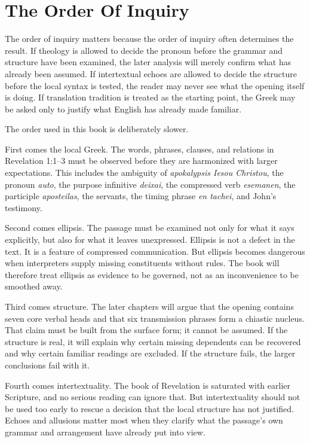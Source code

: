 \section{The Order Of Inquiry}

The order of inquiry matters because the order of inquiry often determines the result. If theology is allowed to decide the pronoun before the grammar and structure have been examined, the later analysis will merely confirm what has already been assumed. If intertextual echoes are allowed to decide the structure before the local syntax is tested, the reader may never see what the opening itself is doing. If translation tradition is treated as the starting point, the Greek may be asked only to justify what English has already made familiar.

The order used in this book is deliberately slower.

First comes the local Greek. The words, phrases, clauses, and relations in Revelation 1:1--3 must be observed before they are harmonized with larger expectations. This includes the ambiguity of \textit{apokalypsis Iesou Christou}, the pronoun \textit{auto}, the purpose infinitive \textit{deixai}, the compressed verb \textit{esemanen}, the participle \textit{aposteilas}, the servants, the timing phrase \textit{en tachei}, and John's testimony.

Second comes ellipsis. The passage must be examined not only for what it says explicitly, but also for what it leaves unexpressed. Ellipsis is not a defect in the text. It is a feature of compressed communication. But ellipsis becomes dangerous when interpreters supply missing constituents without rules. The book will therefore treat ellipsis as evidence to be governed, not as an inconvenience to be smoothed away.

Third comes structure. The later chapters will argue that the opening contains seven core verbal heads and that six transmission phrases form a chiastic nucleus. That claim must be built from the surface form; it cannot be assumed. If the structure is real, it will explain why certain missing dependents can be recovered and why certain familiar readings are excluded. If the structure fails, the larger conclusions fail with it.

Fourth comes intertextuality. The book of Revelation is saturated with earlier Scripture, and no serious reading can ignore that. But intertextuality should not be used too early to rescue a decision that the local structure has not justified. Echoes and allusions matter most when they clarify what the passage's own grammar and arrangement have already put into view.

